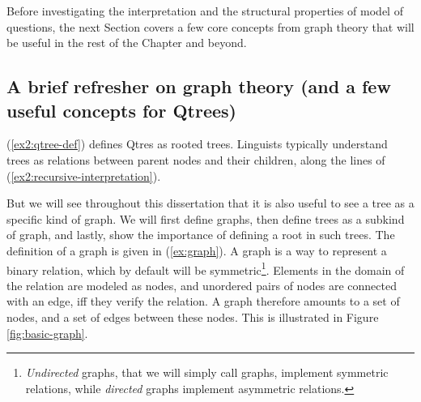 Before investigating the interpretation and the structural properties of model of questions, the next Section covers a few core concepts from graph theory that will be useful in the rest of the Chapter and beyond.


\subsection{A brief refresher on graph theory (and a few useful concepts for Qtrees)}

(\ref{ex2:qtree-def}) defines Qtres as rooted trees. Linguists typically understand trees as relations between parent nodes and their children, along the lines of (\ref{ex2:recursive-interpretation}).

\begin{exe}
	\label{ex:tree-inductive}
\end{exe}

But we will see throughout this dissertation that it is also useful to see a tree as a specific kind of graph. We will first define graphs, then define trees as a subkind of graph, and lastly, show the importance of defining a root in such trees. The definition of a graph is given in (\ref{ex:graph}). A graph is a way to represent a binary relation, which by default will be symmetric\footnote{\textit{Undirected} graphs, that we will simply call graphs, implement symmetric relations, while \textit{directed} graphs implement asymmetric relations.}. Elements in the domain of the relation are modeled as nodes, and unordered pairs of nodes are connected with an edge, iff they verify the relation. A graph therefore amounts to a set of nodes, and a set of edges between these nodes. This is illustrated in Figure \ref{fig:basic-graph}.

\begin{exe}	
	\label{ex:graph}
\end{exe}

